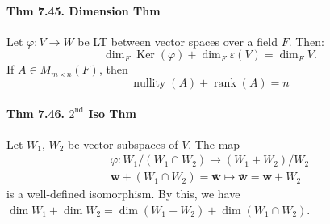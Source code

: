 \paragraph{Thm 7.45. Dimension Thm} Let $\varphi: V\rightarrow W$ be LT between vector spaces over a field $F$. Then:
$$
\operatorname{dim}_F\operatorname{Ker}(\varphi) + \operatorname{dim}_F\varepsilon(V) = \operatorname{dim}_F V.
$$
If $A \in M_{m\times n}(F)$, then 
$$
\operatorname{nullity}(A) + \operatorname{rank}(A)=n
$$

\paragraph{Thm 7.46. $2^\text{nd}$ Iso Thm} Let $W_1$, $W_2$ be vector subspaces of $V$. The map 
$$\begin{gathered}\varphi:W_1 /\left(W_1 \cap W_2\right) \rightarrow\left(W_1+W_2\right) / W_2 \\\mathbf{w}+\left(W_1 \cap W_2\right)=\overline{\mathbf{w}} \mapsto \overline{\mathbf{w}}=\mathbf{w}+W_2\end{gathered}$$ is a well-defined isomorphism. By this, we have $\dim W_1 + \dim W_2 = \dim(W_1 + W_2) + \dim (W_1  \cap W_2)$.